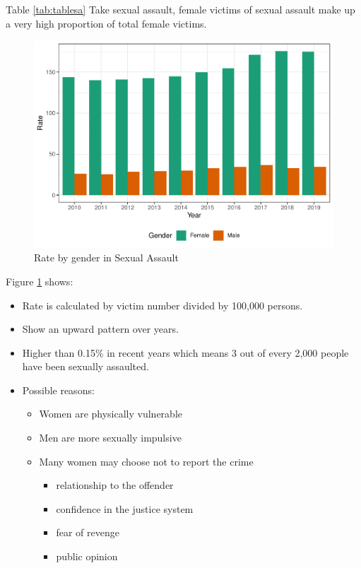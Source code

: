 \documentclass[11pt,a4paper,]{article}
\providecommand{\tightlist}{%
  \setlength{\itemsep}{0pt}\setlength{\parskip}{0pt}}
\begin{document}
Table \ref{tab:tablesa}
Take sexual assault, female victims of sexual assault make up a very high proportion of total female victims.

\begin{figure}
\centering
\includegraphics{report_files/figure-latex/gendersa-1.pdf}
\caption{\label{fig:gendersa}Rate by gender in Sexual Assault}
\end{figure}

Figure \ref{fig:gendersa} shows:

\begin{itemize}
\tightlist
\item
  Rate is calculated by victim number divided by 100,000 persons.
\item
  Show an upward pattern over years.
\item
  Higher than 0.15\% in recent years which means 3 out of every 2,000 people have been sexually assaulted.
\item
  Possible reasons:

  \begin{itemize}
  \tightlist
  \item
    Women are physically vulnerable
  \item
    Men are more sexually impulsive
  \item
    Many women may choose not to report the crime

    \begin{itemize}
    \tightlist
    \item
      relationship to the offender
    \item
      confidence in the justice system
    \item
      fear of revenge
    \item
      public opinion
    \end{itemize}
  \end{itemize}
\end{itemize}
\end{document}
